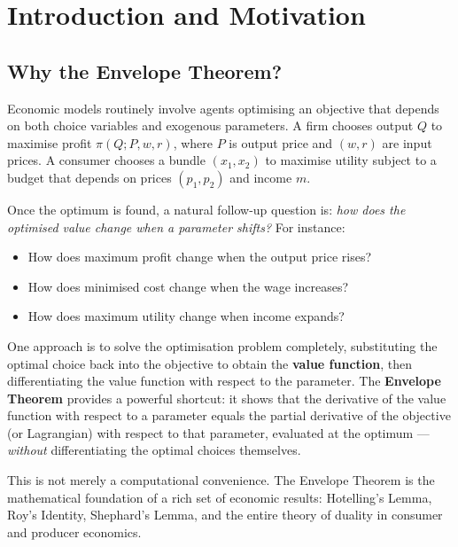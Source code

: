 \documentclass[12pt, a4paper]{article}
\theoremstyle{definition}
\begin{document}
\newpage
\tableofcontents
\newpage

\section{Introduction and Motivation}

\subsection{Why the Envelope Theorem?}

Economic models routinely involve agents optimising an objective that depends
on both choice variables and exogenous parameters. A firm chooses output $Q$
to maximise profit $\pi(Q; P, w, r)$, where $P$ is output price and $(w, r)$
are input prices. A consumer chooses a bundle $(x_1, x_2)$ to maximise
utility subject to a budget that depends on prices $(p_1, p_2)$ and income
$m$.

Once the optimum is found, a natural follow-up question is: \emph{how does
the optimised value change when a parameter shifts?} For instance:
\begin{itemize}
  \item How does maximum profit change when the output price rises?
  \item How does minimised cost change when the wage increases?
  \item How does maximum utility change when income expands?
\end{itemize}

One approach is to solve the optimisation problem completely, substituting the
optimal choice back into the objective to obtain the \textbf{value function},
then differentiating the value function with respect to the parameter. The
\textbf{Envelope Theorem} provides a powerful shortcut: it shows that the
derivative of the value function with respect to a parameter equals the
partial derivative of the objective (or Lagrangian) with respect to that
parameter, evaluated at the optimum --- \emph{without} differentiating the
optimal choices themselves.

This is not merely a computational convenience. The Envelope Theorem is the
mathematical foundation of a rich set of economic results: Hotelling's Lemma,
Roy's Identity, Shephard's Lemma, and the entire theory of duality in consumer
and producer economics.
\end{document}
